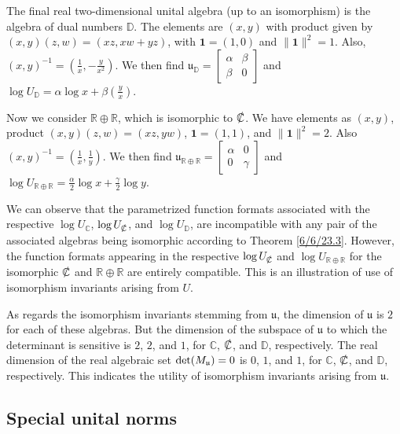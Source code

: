 \documentclass{amsart}
\numberwithin{equation}{section}
\theoremstyle{definition}
\numberwithin{theorem}{section}
\begin{document}
The final real two-dimensional unital algebra (up to an isomorphism) is the algebra of dual numbers $\mathbb{D}$.  The elements are $(x,y)$ with product given by $(x,y)(z,w) = (xz,xw+yz)$, with $\mathbf{1}=(1,0)$ and $\|\mathbf{1}\|^2 = 1$. Also, $(x,y)^{-1} = (\frac{1}{x},-\frac{y}{x^2})$.  We then find $\mathfrak{u}_\mathbb{D} = \left[\begin{array}{ccc}
 \alpha & \beta   \\ 
 \beta & 0    
\end{array}\right]$ and $\log  U_{\mathbb{D}} = \alpha\log x + \beta\left(\frac{y}{x}\right)$.

Now we consider $\mathbb{R}\oplus\mathbb{R}$, which is isomorphic to $\slashed{\mathbb{C}}$.  We have elements as $(x,y)$, product $(x,y)(z,w) = (xz,yw)$, $\mathbf{1}=(1,1)$, and $\|\mathbf{1}\|^2 = 2$.  Also $(x,y)^{-1} = (\frac{1}{x},\frac{1}{y})$.  We then find $\mathfrak{u}_{\mathbb{R}\oplus\mathbb{R}} = \left[\begin{array}{ccc}
 \alpha & 0   \\ 
 0 & \gamma    
\end{array}\right]$ and $\log  U_{\mathbb{R}\oplus\mathbb{R}} = \frac{\alpha}{2}\log x + \frac{\gamma}{2}\log y$.

We can observe that the parametrized function formats associated with the respective $\log U_{\mathbb{C}}$, $\log U_{\slashed{\mathbb{C}}}$, and $\log U_{\mathbb{D}}$, are incompatible with any pair of the associated algebras being isomorphic according to Theorem \ref{6/6/23.3}.  However, the function formats appearing in the respective $\log U_{\slashed{\mathbb{C}}}$ and $\log U_{\mathbb{R}\oplus\mathbb{R}}$  for the isomorphic $\slashed{\mathbb{C}}$ and $\mathbb{R}\oplus\mathbb{R}$ are entirely compatible.  This is an illustration of use of isomorphism invariants arising from $U$.

  As regards the isomorphism invariants stemming from $\mathfrak{u}$, the dimension of $\mathfrak{u}$ is $2$ for each of these algebras.  But the dimension of the subspace of $\mathfrak{u}$ to which the determinant is sensitive is $2$, $2$, and $1$, for $\mathbb{C}$, $\slashed{\mathbb{C}}$, and $\mathbb{D}$, respectively.  The real dimension of the real algebraic set ${\rm det}(M_{\mathfrak{u}}) = 0$ is $0$, $1$, and $1$, for $\mathbb{C}$, $\slashed{\mathbb{C}}$, and $\mathbb{D}$, respectively.  This indicates the utility of isomorphism invariants arising from $\mathfrak{u}$. 

\subsection{Special unital norms}
\end{document}
